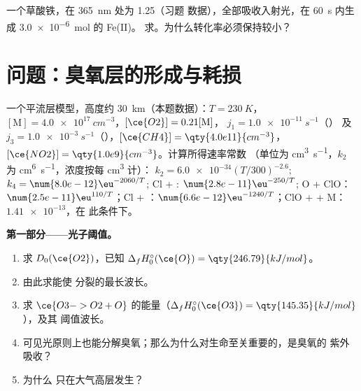 \begin{exercise}[$\star\star\star$]\label{exo:b3:photochemistry:12}
一个草酸铁，在 \qty{365}{nm} 处为 1.25（习题
数据），全部吸收入射光，在 \qty{60}{s} 内生成 \qty{3.0e-6}{mol} 的 Fe(II)。
求。为什么转化率必须保持较小？
\end{exercise}

\section{问题：臭氧层的形成与耗损}

\begin{problem}
\label{pb:b3:photochemistry:1}
一个平流层模型，高度约 \qty{30}{km}（本题数据）：$T = \qty{230}{K}$，$[\mathrm M] =
\qty{4.0e17}{cm^{-3}}$，$[\ce{O2}] = 0.21[\mathrm M]$， $j_1 = \qty{1.0e-11}{s^{-1}}$（）
及 $j_3 = \qty{1.0e-3}{s^{-1}}$（），$[\ce{CH4}] = \qty{4.0e11}{cm^{-3}}$，$[\ce{NO2}] = \qty{1.0e9}{cm^{-3}}$。计算所得速率常数
（单位为 \unit{cm^3.s^{-1}}，$k_2$ 为 \unit{cm^6.s^{-1}}，浓度按每 \unit{cm^3} 计）：
$k_2 = \num{6.0e-34}(T/300)^{-2.6}$; $k_4 = \num{8.0e-12}\eu^{-2060/T}$; Cl + : $\num{2.8e-11}\eu^{-250/T}$;
O + ClO：$\num{2.5e-11}\eu^{110/T}$；Cl + ：$\num{6.6e-12}\eu^{-1240/T}$；ClO +  + M：$\num{1.41e-13}$，在
此条件下。

\medskip\noindent\textbf{第一部分——光子阈值。}
\begin{enumerate}
  \item 求 $D_0(\ce{O2})$，已知 $\Delta_fH^\circ_0(\ce{O}) = \qty{246.79}{kJ/mol}$。
  \item 由此求能使  分裂的最长波长。
  \item 求 $\ce{O3 -> O2 + O}$ 的能量（$\Delta_fH^\circ_0(\ce{O3}) = \qty{145.35}{kJ/mol}$），及其
        阈值波长。
  \item 可见光原则上也能分解臭氧；那么为什么对生命至关重要的，是臭氧的
        紫外吸收？
  \item 为什么  只在大气高层发生？
\end{enumerate}


\end{problem}
